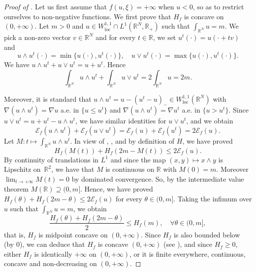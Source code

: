 \documentclass[JEP,XML,SOM,Unicode,published]{cedram}
\theoremstyle{plain}
\theoremstyle{definition}
\newcommand{\R}{\mathbb{R}}
\newcommand{\ener}{\mathcal{E}}
\newcommand{\loc}{\mathrm{loc}}
\begin{document}
\begin{proof}[Proof of ]
Let us first assume that $f(u,\xi) = +\infty$ when $u< 0$, so as to restrict ourselves to non-negative functions. We first prove that \(H_f\) is concave on \((0,+\infty)\).
Let \(m>0\) and \(u\in W^{1,1}_\loc\cap L^1(\R^N,\R_+)\) such that \(\int_{\R^N}u=m\). We pick a non-zero vector \(v\in\R^N\) and for every \(t\in\R\), we set \(u^t(\cdot)=u(\cdot+tv)\) and
\[
u\wedge u^t(\cdot)=\min\{u(\cdot),u^t(\cdot)\},\quad u\vee u^t(\cdot)=\max\{u(\cdot),u^t(\cdot)\}.
\]
We have \(u\wedge u^t+u\vee u^t=u+u^t\). Hence
\begin{equation}
\label{massAdditivity}
\int_{\R^N}u\wedge u^t+\int_{\R^N}u\vee u^t=2\int_{\R^N}u=2m.
\end{equation}

Moreover, it is standard that \(u\wedge u^t=u-(u^{t}-u)_-\in W^{1,1}_\loc(\R^N)\) with \(\nabla (u\wedge u^t)=\nabla u\) a.e. in \(\{u\leq u^t\}\) and \(\nabla (u\wedge u^t)=\nabla u^t\) a.e. in \(\{u>u^t\}\). Since \(u\vee u^t=u+u^t-u\wedge u^t\), we have similar identities for \(u\vee u^t\), and we obtain
\begin{equation}
\label{energyAdditivity}
\ener_f(u\wedge u^t)+\ener_f(u\vee u^t)=\ener_f(u)+\ener_f(u^t)=2\ener_f(u).
\end{equation}
Let \(M:t\mapsto\int_{\R^N}u\wedge u^t\). In view of , , and by definition of \(H\), we have proved
\begin{equation}
H_f(M(t))+H_f(2m-M(t))\leq 2\ener_f(u).
\end{equation}
By continuity of translations in \(L^1\) and since the map \((x,y)\mapsto x\wedge y\) is Lipschitz on~\(\R^2\), we have that \(M\) is continuous on \(\R\) with \(M(0)=m\). Moreover \(\lim_{t\to +\infty}M(t)=0\) by dominated convergence.
So, by the intermediate value theorem \(M(\R)\supseteq (0,m]\). Hence, we have proved \(H_f(\theta)+H_f(2m-\theta)\leq 2\ener_f(u)\) for every \(\theta\in(0,m]\). Taking the infimum over \(u\) such that \(\int_{\R^N}u=m\), we obtain
\[
\frac{H_f(\theta)+H_f(2m-\theta)}{2}\leq H_f(m),\quad \forall\theta\in(0,m],
\]
that is, \(H_f\) is midpoint concave on \((0,+\infty)\). Since \(H_f\) is also bounded below (by \(0\)), we can deduce that \(H_f\) is concave \((0,+\infty)\) (see \cite[\S 72]{robertsConvexFunctions1973}), and since $H_f \geq 0$, either $H_f$ is identically $+\infty$ on $(0,+\infty)$, or it is finite everywhere, continuous, concave and non-decreasing on $(0,+\infty)$.


\end{proof}
\end{document}
